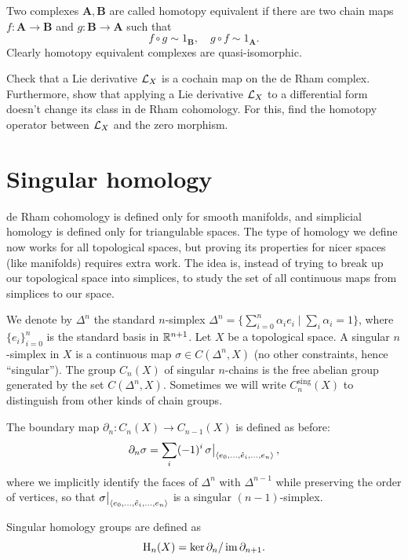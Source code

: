 \begin{defn}
    Two complexes $\bm{A},\bm{B}$ are called homotopy equivalent if there are two chain maps $f:\bm{A}\to \bm{B}$ and $g:\bm{B}\to\bm{A}$ such that
    \[f\circ g\sim 1_{\bm{B}},\quad g\circ f\sim 1_{\bm{A}}.\]
    Clearly homotopy equivalent complexes are quasi-isomorphic.
\end{defn}


\begin{xca}\label{Lie derivative homotopy operator}
    Check that a Lie derivative $\mathcal{L}_X$ is a cochain map on the de Rham complex. Furthermore, show that applying a Lie derivative $\mathcal{L}_X$ to a differential form doesn't change its class in de Rham cohomology. For this, find the homotopy operator between $\mathcal{L}_X$ and the zero morphism.
\end{xca}







\section{Singular homology}

de Rham cohomology is defined only for smooth manifolds, and simplicial homology is defined only for triangulable spaces. The type of homology we define now works for all topological spaces, but proving its properties for nicer spaces (like manifolds) requires extra work. The idea is, instead of trying to break up our topological space into simplices, to study the set of all continuous maps from simplices to our space.

\begin{defn}
    We denote by $\Delta^n$ the standard $n$-simplex $\Delta^n=\{\sum_{i=0}^{n} \alpha_i e_i\mid \sum_i\alpha_i=1\}$, where $\{e_i\}_{i=0}^{n}$ is the standard basis in $\mathbb{R}^{n+1}$. Let $X$ be a topological space. A singular $n$-simplex in $X$ is a continuous map $\sigma\in C(\Delta^n, X)$ (no other constraints, hence ``singular''). The group $C_n(X)$ of singular $n$-chains is the free abelian group generated by the set $C(\Delta^n,X)$. Sometimes we will write $C^{\text{sing}}_n(X)$ to distinguish from other kinds of chain groups.
\end{defn}
\begin{defn}
    The boundary map $\partial_n:C_n(X)\to C_{n-1}(X)$ is defined as before:
    \[\partial_n\sigma=\sum_i (-1)^i\restr{\sigma}{\langle e_0,\ldots,\wh{e}_i,\ldots,e_n\rangle},\]
    where we implicitly identify the faces of $\Delta^n$ with $\Delta^{n-1}$ while preserving the order of vertices, so that $\restr{\sigma}{\langle e_0,\ldots,\wh{e}_i,\ldots,e_n\rangle}$ is a singular $(n-1)$-simplex.
    
    Singular homology groups are defined as
    \[\mathrm{H}_n(X)=\ker\partial_n/\operatorname{im}\partial_{n+1}.\]
\end{defn}

